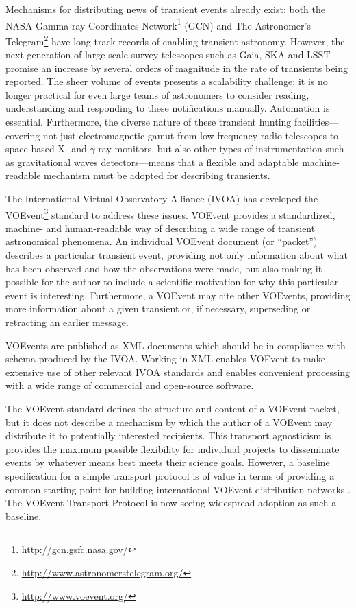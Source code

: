 \documentclass[5p,authoryear]{elsarticle}
\begin{document}
Mechanisms for distributing news of transient events already exist: both the
NASA Gamma-ray Coordinates Network\footnote{\url{http://gcn.gsfc.nasa.gov/}}
(GCN) and The Astronomer's
Telegram\footnote{\url{http://www.astronomerstelegram.org/}} have long track
records of enabling transient astronomy. However, the next generation of
large-scale survey telescopes such as Gaia, SKA and LSST promise an increase
by several orders of magnitude in the rate of transients being reported.  The
sheer volume of events presents a scalability challenge: it is no longer
practical for even large teams of astronomers to consider reading,
understanding and responding to these notifications manually. Automation is
essential. Furthermore, the diverse nature of these transient hunting
facilities---covering not just electromagnetic gamut from low-frequency radio
telescopes to space based X- and $\gamma$-ray monitors, but also other types
of instrumentation such as gravitational waves detectors---means that a
flexible and adaptable machine-readable mechanism must be adopted for
describing transients.

The International Virtual Observatory Alliance (IVOA) has developed the
VOEvent\footnote{\url{http://www.voevent.org/}} \citep{Seaman:2011} standard
to address these issues. VOEvent provides a standardized, machine- and
human-readable way of describing a wide range of transient astronomical
phenomena. An individual VOEvent document (or ``packet'') describes a
particular transient event, providing not only information about what has been
observed and how the observations were made, but also making it possible for
the author to include a scientific motivation for why this particular event is
interesting.  Furthermore, a VOEvent may cite other VOEvents, providing more
information about a given transient or, if necessary, superseding or
retracting an earlier message.

VOEvents are published as XML \citep{Bray:2008} documents which should be in
compliance with schema \citep{Gau:2012, Peterson:2012} produced by the IVOA.
Working in XML enables VOEvent to make extensive use of other relevant IVOA
standards and enables convenient processing with a wide range of commercial
and open-source software.

The VOEvent standard defines the structure and content of a VOEvent packet,
but it does not describe a mechanism by which the author of a VOEvent may
distribute it to potentially interested recipients. This transport agnosticism
is provides the maximum possible flexibility for individual projects to
disseminate events by whatever means best meets their science goals. However,
a baseline specification for a simple transport protocol is of value in terms
of providing a common starting point for building international VOEvent
distribution networks \citep{Williams:2012}.  The VOEvent Transport Protocol
\citep[VTP;][]{Allan:2009} is now seeing widespread adoption as such a
baseline.
\end{document}
